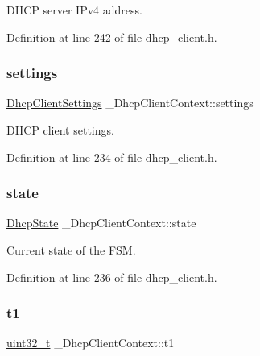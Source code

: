 D\+H\+CP server I\+Pv4 address. 



Definition at line 242 of file dhcp\+\_\+client.\+h.

\mbox{\label{struct__DhcpClientContext_acc01c3ef8f705d1dc40c2fdbea49dfa2}} 
\subsubsection{\texorpdfstring{settings}{settings}}
{\footnotesize\ttfamily \hyperlink{structDhcpClientSettings}{Dhcp\+Client\+Settings} \+\_\+\+Dhcp\+Client\+Context\+::settings}



D\+H\+CP client settings. 



Definition at line 234 of file dhcp\+\_\+client.\+h.

\mbox{\label{struct__DhcpClientContext_a93d8a0f7b21aa13ae8b901c9b3cda016}} 
\subsubsection{\texorpdfstring{state}{state}}
{\footnotesize\ttfamily \hyperlink{dhcp__client_8h_ac6f9e98cfbc157d444ee4e20430d65d4}{Dhcp\+State} \+\_\+\+Dhcp\+Client\+Context\+::state}



Current state of the F\+SM. 



Definition at line 236 of file dhcp\+\_\+client.\+h.

\mbox{\label{struct__DhcpClientContext_a9b95db689cef6cc75d7ff2edba47843d}} 
\subsubsection{\texorpdfstring{t1}{t1}}
{\footnotesize\ttfamily \hyperlink{stdint_8h_a435d1572bf3f880d55459d9805097f62}{uint32\+\_\+t} \+\_\+\+Dhcp\+Client\+Context\+::t1}



